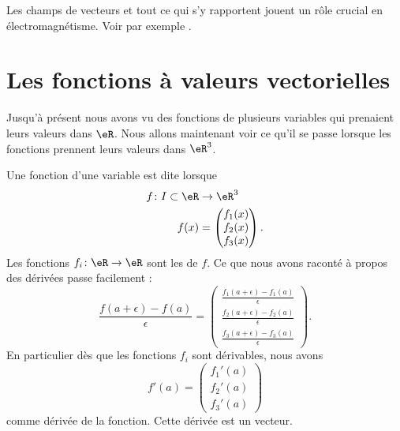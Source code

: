 
Les champs de vecteurs et tout ce qui s'y rapportent jouent un rôle crucial en électromagnétisme. Voir par exemple \cite{Schomblond_em}.

\section{Les fonctions à valeurs vectorielles}

Jusqu'à présent nous avons vu des fonctions de plusieurs variables qui prenaient leurs valeurs dans $\eR$. Nous allons maintenant voir ce qu'il se passe lorsque les fonctions prennent leurs valeurs dans $\eR^3$.

Une fonction d'une variable est dite  lorsque
\begin{equation}
    \begin{aligned}
        f\colon I\subset \eR&\to \eR^3 \\
        f(x)&=\begin{pmatrix}
            f_1(x)    \\ 
            f_2(x)    \\ 
            f_3(x)    
        \end{pmatrix}.
    \end{aligned}
\end{equation}
Les fonctions $f_i\colon \eR\to \eR$ sont les  de $f$. Ce que nous avons raconté à propos des dérivées passe facilement :
\begin{equation}
    \frac{ f(a+\epsilon)-f(a) }{ \epsilon }=
    \begin{pmatrix}
        \frac{ f_1(a+\epsilon)-f_1(a) }{ \epsilon }    \\ 
        \frac{ f_2(a+\epsilon)-f_2(a) }{ \epsilon }    \\ 
        \frac{ f_3(a+\epsilon)-f_3(a) }{ \epsilon }    
    \end{pmatrix}.
\end{equation}
En particulier dès que les fonctions $f_i$ sont dérivables, nous avons
\begin{equation}
    f'(a)=\begin{pmatrix}
        f_1'(a)    \\ 
        f_2'(a)    \\ 
        f_3'(a)    
    \end{pmatrix}
\end{equation}
comme dérivée de la fonction. Cette dérivée est un vecteur.

